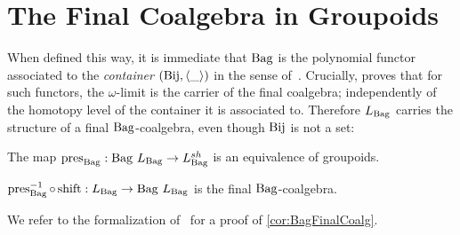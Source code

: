 \documentclass[final,a4paper,USenglish,cleveref]{lipics-v2021}
\begin{document}
\section{The Final Coalgebra in Groupoids}\label{sec:final-coalgebra-groupoids}

When defined this way, it is immediate that $\Bag$ is the polynomial functor associated to the \emph{container}
$(\Bij, \langle\Blank\rangle)$ in the sense of~\cite[Definition~2]{Ahrens2015}.
Crucially, \cite[Theorem~7]{Ahrens2015} proves that for such functors, the $\omega$-limit is the carrier of the final coalgebra;
independently of the homotopy level of the container it is associated to.
Therefore $\Lim{\Bag}$ carries the structure of a final $\Bag$-coalgebra, even though $\Bij$ is not a set:

\begin{theorem}\label{thm:BagPresLim}
  The map $\pres{\Bag} : \Bag\,\Lim{\Bag} \to \LimSh{\Bag}$ is an equivalence of groupoids.
\end{theorem}

\begin{corollary}\label{cor:BagFinalCoalg}
  $\pres{\Bag}^{-1} \circ \Op{shift} : \Lim{\Bag} \to \Bag\,\Lim{\Bag}$ is the final $\Bag$-coalgebra.
\end{corollary}
We refer to the formalization of~\cite{Ahrens2015} for a proof of \cref{cor:BagFinalCoalg}.
\end{document}
